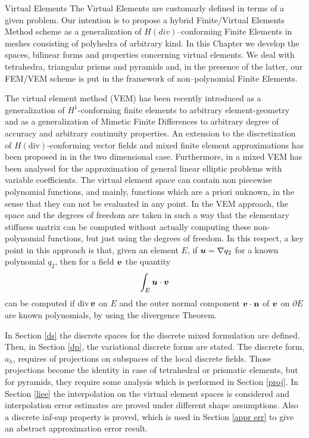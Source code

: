 \begin{chapter}{Virtual Elements}
The Virtual Elements are customarly defined in terms of a given problem. Our
intention 
is to propose a hybrid Finite/Virtual Elements Method scheme
as a generalization of $H(div)$--conforming Finite Elements
in meshes consisting of polyhedra of arbitrary kind. In this Chapter we develop
the spaces, bilinear forms and properties concerning 
virtual elements.
We deal with tetrahedra, triangular prisms and pyramids and, in the presence of
the latter, our FEM/VEM scheme is put in the framework of 
non--polynomial Finite Elements.

{
\color{red}

The virtual element method (VEM) has been recently introduced \cite{MR2997471} as a 
generalization of $H^1$-conforming finite elements to arbitrary element-geometry 
and as a generalization of Mimetic Finite Differences to arbitrary degree of
accuracy and arbitrary continuity properties. An extension to the 
discretization of $H(\mbox{div})$-conforming vector fields and mixed finite element 
approximations has been proposed in \cite{bfm} 
in the two dimensional case. Furthermore, in \cite{MR3507271} a mixed VEM has been
analysed for the approximation of general linear elliptic problems with variable
coefficients.  The virtual element space can contain non piecewise polynomial
functions, and mainly, functions which are a priori unknown, in the sense that they
can not be evaluated in any point. In the VEM approach, the space and the degrees
of freedom are taken in such a way that the elementary stiffness matrix can be 
computed without actually computing these non-polynomial functions, but just using 
the degrees of freedom. In this respect, a key
point in this approach is that, given an element $E$, if $\boldsymbol{u}=\nabla q_2$ for a known 
polynomial $q_2$, then for a field $\boldsymbol{v}$ the quantity 
\[
\int_E\boldsymbol{u}\cdot\boldsymbol{v}
\]
can be computed if $\mbox{div\,}\boldsymbol{v}$ on $E$ and the outer normal component $\boldsymbol{v}\cdot{\bf n}$ of $\boldsymbol{v}$ on 
$\partial E$ are known polynomials, by using the divergence Theorem.

In Section \ref{ds} the discrete spaces for the discrete mixed formulation are defined. 
Then, in Section \ref{dp}, the 
variational discrete forms are stated. The discrete form, $a_h$, requires of projections 
on subspaces of the local discrete 
fields. Those projections become the identity in case of tetrahedral or prismatic elements, 
but for pyramids, they require some analysis which is performed in Section \ref{proj}. 
In Section \ref{liee} the interpolation on the virtual element spaces is considered and 
interpolation error estimates are proved under different shape assumptions. Also a 
discrete inf-sup property is proved, which is used in Section \ref{appr err} to 
give an abstract approximation error result. 

}
\end{chapter}

